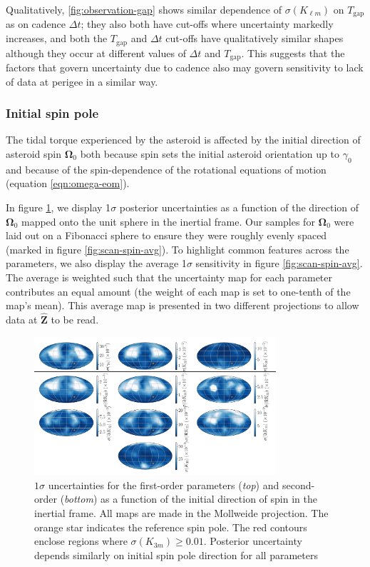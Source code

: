 \documentclass[fleqn,usenatbib]{mnras}
\newcommand{\unit}[1]{\bm{\hat{#1}}}
\begin{document}
Qualitatively, \ref{fig:observation-gap} shows similar dependence of $\sigma(K_{\ell m})$ on $T_\text{gap}$ as on cadence $\Delta t$; they also both have cut-offs where uncertainty markedly increases, and both the $T_\text{gap}$ and $\Delta t$ cut-offs have qualitatively similar shapes although they occur at different values of $\Delta t$ and $T_\text{gap}$. This suggests that the factors that govern uncertainty due to cadence also may govern sensitivity to lack of data at perigee in a similar way.


\subsubsection{Initial spin pole}
\label{sec:scan-spin}

The tidal torque experienced by the asteroid is affected by the initial direction of asteroid spin $\bm \Omega_0$ both because spin sets the initial asteroid orientation up to $\gamma_0$ and because of the spin-dependence of the rotational equations of motion (equation \ref{eqn:omega-eom}).

In figure \ref{fig:scan-spin}, we display 1$\sigma$ posterior uncertainties as a function of the direction of $\bm \Omega_0$ mapped onto the unit sphere in the inertial frame. Our samples for $\bm \Omega_0$ were laid out on a Fibonacci sphere to ensure they were roughly evenly spaced (marked in figure \ref{fig:scan-spin-avg}). To highlight common features across the parameters, we also display the average 1$\sigma$ sensitivity in figure \ref{fig:scan-spin-avg}. The average is weighted such that the uncertainty map for each parameter contributes an equal amount (the weight of each map is set to one-tenth of the map's mean). This average map is presented in two different projections to allow data at $\unit Z$ to be read.

\begin{figure}
  \centering
  \includegraphics[width=0.8\textwidth]{figs/spin-pole.png}
  \caption{$1\sigma$ uncertainties for the first-order parameters (\textit{top}) and second-order (\textit{bottom}) as a function of the initial direction of spin in the inertial frame. All maps are made in the Mollweide projection. The orange star indicates the reference spin pole. The red contours enclose regions where $\sigma(K_{3m}) \geq 0.01$. Posterior uncertainty depends similarly on initial spin pole direction for all parameters}
  \label{fig:scan-spin}
\end{figure}
\end{document}
